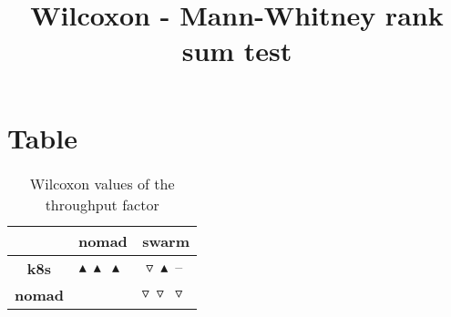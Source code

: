 \documentclass{article}
\title{Wilcoxon - Mann-Whitney rank sum test}
\author{}
\begin{document}
\maketitle
\section{Table}
\begin{table}[!htp]
  \caption{Wilcoxon values of the throughput factor}
  \label{table:throughput}
  \centering
  \begin{scriptsize}
  \begin{tabular}{c|cc}
      & \textbf{nomad} & \textbf{swarm} \\\hline
      \textbf{k8s} & $\blacktriangle\ \blacktriangle\ \blacktriangle\  $ & $ \triangledown\ \blacktriangle\ \text{--}\ $ \\
      \textbf{nomad} & $ $ & $ \triangledown\ \triangledown\ \triangledown\ $ \\
  \end{tabular}
  \end{scriptsize}
\end{table}
\end{document}
